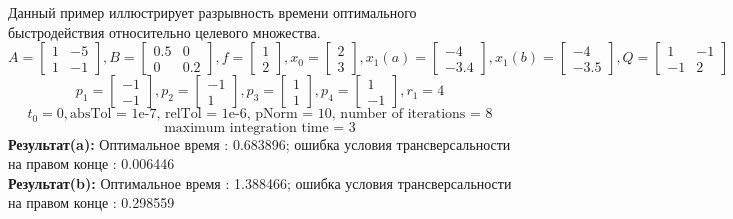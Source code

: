\documentclass[10pt]{article}
\begin{document}
Данный пример иллюстрирует разрывность времени оптимального быстродействия относительно целевого множества. 
 \[ A = \begin{bmatrix}
      		1 & -5 \\[0.3em]
      		1 & -1
      	  \end{bmatrix} , 
 B = \begin{bmatrix}
      	   0.5 & 0 \\[0.3em]
      	   0 & 0.2
      \end{bmatrix} ,
 f = \begin{bmatrix}
       	    1 \\[0.3em]
      	    2
      \end{bmatrix} ,
 x_0 = \begin{bmatrix}
      	    2 \\[0.3em]
      	    3
      \end{bmatrix} ,
 x_1(a) = \begin{bmatrix}
      	-4 \\[0.3em]
      	-3.4
      \end{bmatrix} ,
x_1(b) = \begin{bmatrix}
      	-4 \\[0.3em]
      	-3.5
      \end{bmatrix} ,
 Q = \begin{bmatrix}
      	   1 & -1 \\[0.3em]
      	   -1 & 2
      \end{bmatrix} \]
\[ p_1 = \begin{bmatrix}
      	-1 \\[0.3em]
      	-1
      \end{bmatrix} ,
p_2 = \begin{bmatrix}
      	-1 \\[0.3em]
      	1
      \end{bmatrix} ,
p_3 = \begin{bmatrix}
      	1 \\[0.3em]
      	1
      \end{bmatrix} ,
p_4 = \begin{bmatrix}
      	1 \\[0.3em]
      	-1
      \end{bmatrix}, r_1 = 4 \]
\[ t_0 = 0, \text{absTol = 1e-7, relTol = 1e-6, pNorm = 10, number of iterations = 8}\]  
\[\text{maximum integration time = 3} \]
\textbf{Результат(a):} Оптимальное время : 0.683896; ошибка условия трансверсальности на правом конце : 0.006446 \\
\textbf{Результат(b):} Оптимальное время : 1.388466; ошибка условия трансверсальности на правом конце : 0.298559 
\end{document}
